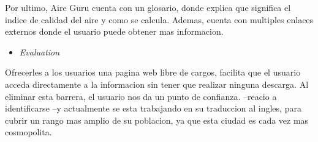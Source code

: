 Por ultimo, Aire Guru cuenta con un glosario, donde explica que significa el indice de calidad del aire y como se calcula. 
Ademas, cuenta con multiples enlaces externos donde el usuario puede obtener mas informacion.
\begin{itemize}
    \item \textit{Evaluation}
\end{itemize}
Ofrecerles a los usuarios una pagina web libre de cargos, facilita que el usuario acceda directamente a la informacion
sin tener que realizar ninguna descarga. Al eliminar esta barrera, el usuario nos da un punto de confianza.
--reacio a identificarse
--y actualmente se esta trabajando en su traduccion al ingles, para cubrir un rango mas amplio de su poblacion, ya que esta ciudad es cada vez mas cosmopolita.
